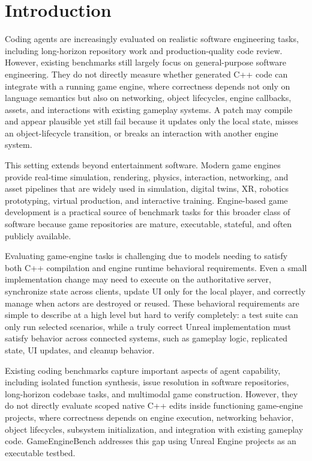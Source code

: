 \documentclass[11pt]{article}
\newcommand{\benchmarkname}{GameEngineBench\xspace}
\begin{document}
\FloatBarrier
\section{Introduction}
Coding agents are increasingly evaluated on realistic software engineering tasks, including long-horizon repository work and production-quality code review. However, existing benchmarks still largely focus on general-purpose software engineering. They do not directly measure whether generated C++ code can integrate with a running game engine, where correctness depends not only on language semantics but also on networking, object lifecycles, engine callbacks, assets, and interactions with existing gameplay systems. A patch may compile and appear plausible yet still fail because it updates only the local state, misses an object-lifecycle transition, or breaks an interaction with another engine system.

This setting extends beyond entertainment software. Modern game engines provide real-time simulation, rendering, physics, interaction, networking, and asset pipelines that are widely used in simulation, digital twins, XR, robotics prototyping, virtual production, and interactive training. Engine-based game development is a practical source of benchmark tasks for this broader class of software because game repositories are mature, executable, stateful, and often publicly available.

Evaluating game-engine tasks is challenging due to models needing to satisfy both C++ compilation and engine runtime behavioral requirements. Even a small implementation change may need to execute on the authoritative server, synchronize state across clients, update UI only for the local player, and correctly manage when actors are destroyed or reused. These behavioral requirements are simple to describe at a high level but hard to verify completely: a test suite can only run selected scenarios, while a truly correct Unreal implementation must satisfy behavior across connected systems, such as gameplay logic, replicated state, UI updates, and cleanup behavior.

Existing coding benchmarks capture important aspects of agent capability, including isolated function synthesis, issue resolution in software repositories, long-horizon codebase tasks, and multimodal game construction. However, they do not directly evaluate scoped native C++ edits inside functioning game-engine projects, where correctness depends on engine execution, networking behavior, object lifecycles, subsystem initialization, and integration with existing gameplay code. \benchmarkname addresses this gap using Unreal Engine projects as an executable testbed.
\end{document}
